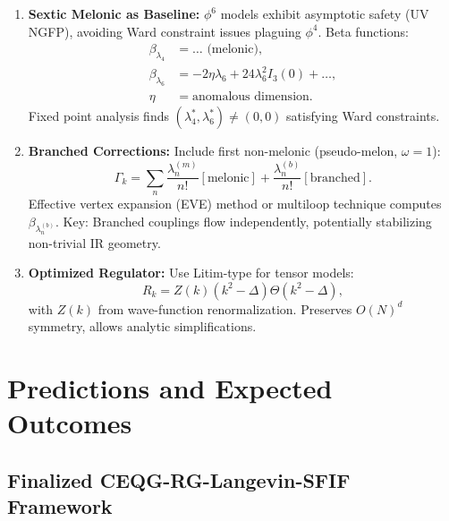 \documentclass[12pt,a4paper]{article}
\begin{document}
\begin{enumerate}
\item \textbf{Sextic Melonic as Baseline:} \(\phi^6\) models exhibit asymptotic safety (UV NGFP), avoiding Ward constraint issues plaguing \(\phi^4\). Beta functions:
\begin{align}
\beta_{\lambda_4} &= \ldots \text{ (melonic)}, \\
\beta_{\lambda_6} &= -2\eta \lambda_6 + 24\lambda_6^2 I_3(0) + \ldots, \\
\eta &= \text{anomalous dimension}.
\end{align}
Fixed point analysis finds \((\lambda_4^*, \lambda_6^*) \neq (0, 0)\) satisfying Ward constraints.

\item \textbf{Branched Corrections:} Include first non-melonic (pseudo-melon, \(\omega=1\)):
\begin{equation}
\Gamma_k = \sum_n \frac{\lambda_n^{(m)}}{n!} [\text{melonic}] + \frac{\lambda_n^{(b)}}{n!} [\text{branched}].
\end{equation}
Effective vertex expansion (EVE) method or multiloop technique computes \(\beta_{\lambda_n^{(b)}}\). Key: Branched couplings flow independently, potentially stabilizing non-trivial IR geometry.

\item \textbf{Optimized Regulator:} Use Litim-type for tensor models:
\begin{equation}
R_k = Z(k)(k^2 - \Delta)\Theta(k^2 - \Delta),
\end{equation}
with \(Z(k)\) from wave-function renormalization. Preserves \(O(N)^d\) symmetry, allows analytic simplifications.
\end{enumerate}

\section{Predictions and Expected Outcomes}

\subsection{Finalized CEQG-RG-Langevin-SFIF Framework}
\end{document}

